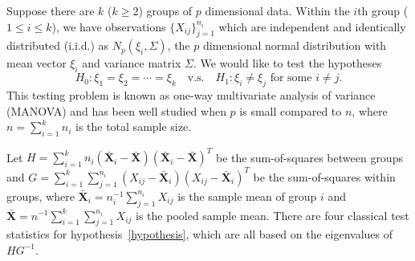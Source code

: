 \documentclass[12pt]{article} %
\renewcommand{\theequation}{\thesection\arabic{equation}}
\DeclareMathOperator{\mytr}{tr}
\newcommand{\bX}{\mathbf{X}}
\theoremstyle{definition}
\begin{document}
\def\thefigure{\arabic{figure}}
\def\thetable{\arabic{table}}

\renewcommand{\theequation}{\thesection.\arabic{equation}}


\fontsize{12}{14pt plus.8pt minus .6pt}\selectfont

\setcounter{section}{1} %
\setcounter{equation}{0} %
Suppose there are $k$ ($k\geq 2$) groups of $p$ dimensional data.
Within the $i$th group ($1\leq i\leq k$), we have observations $\{X_{ij}\}_{j=1}^{n_i}$ which are independent and identically distributed (i.i.d.) as $N_p(\xi_i,\Sigma)$, the $p$ dimensional normal distribution with mean vector $\xi_i$ and variance matrix $\Sigma$.
We would like to test the hypotheses
\begin{equation}\label{hypothesis}
    H_0: \xi_1=\xi_2=\cdots=\xi_k\quad \text{v.s.}\quad　H_1: \text{$\xi_i\neq \xi_j$ for some $i\neq j$}.
\end{equation}
This testing problem is known as one-way multivariate analysis of variance (MANOVA) and has been well studied when $p$ is small compared to $n$, where $n=\sum_{i=1}^k n_i$ is the total sample size.

Let $H=\sum_{i=1}^k n_i (\bar{\bX}_i-\bar{\bX})(\bar{\bX}_i-\bar{\bX})^T$ be the sum-of-squares between groups and $G=\sum_{i=1}^k \sum_{j=1}^{n_i}(X_{ij}-\bar{\bX}_i)(X_{ij}-\bar{\bX}_i)^T$ be the sum-of-squares within groups, where $\bar{\bX}_i=n_i^{-1}\sum_{j=1}^{n_i}X_{ij}$ is the sample mean of group $i$ and $\bar{\bX}=n^{-1}\sum_{i=1}^k\sum_{j=1}^{n_i}X_{ij}$ is the pooled sample mean.
   There are four classical test statistics for hypothesis~\eqref{hypothesis}, which are all based on the eigenvalues of $HG^{-1}$. 

\end{document}
